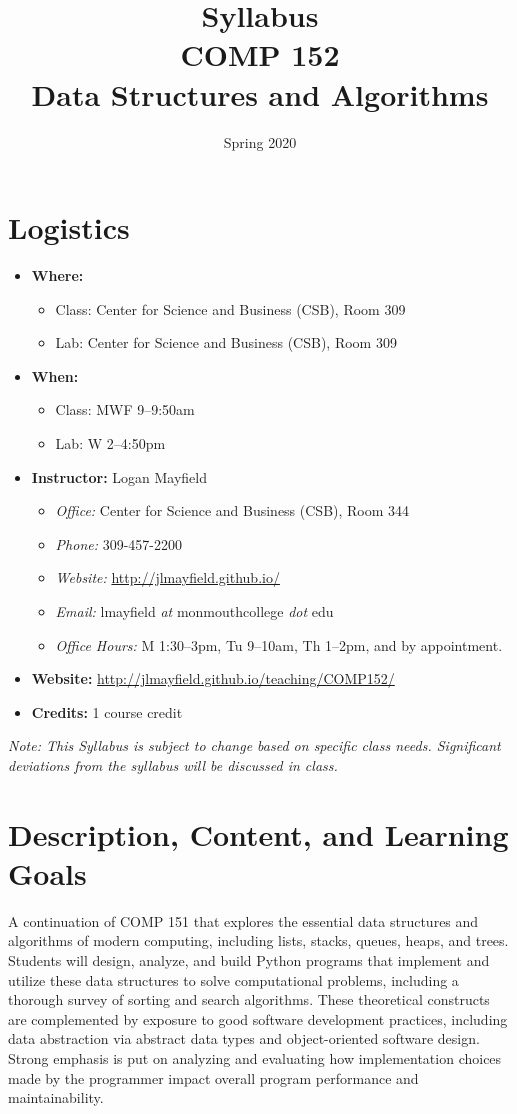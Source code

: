 \documentclass[10pt]{article}
\title{Syllabus \\ COMP 152 \\ Data Structures and Algorithms}
\author{  }
\date{Spring 2020}
\begin{document}
\maketitle

\section{Logistics}
\begin{itemize}
\item \textbf{Where: }
\begin{itemize}
\item Class: Center for Science and Business (CSB), Room 309
\item Lab: Center for Science and Business (CSB), Room 309
\end{itemize}
\item \textbf{When: }
\begin{itemize}
  \item Class: MWF 9--9:50am
  \item Lab: W 2--4:50pm
\end{itemize}
\item \textbf{Instructor: } Logan Mayfield
\begin{itemize}
\item \textit{Office: } Center for Science and Business (CSB), Room 344
\item \textit{Phone: } 309-457-2200 %
\item \textit{Website: } \url{http://jlmayfield.github.io/}
\item \textit{Email: } lmayfield \textit{at} monmouthcollege \textit{dot} edu
\item \textit{Office Hours: }   M 1:30--3pm, Tu 9--10am, Th 1--2pm, and by appointment.
\end{itemize}
\item \textbf{Website: } \url{http://jlmayfield.github.io/teaching/COMP152/}
\item \textbf{Credits: } 1 course credit
\end{itemize}
\emph{Note: This Syllabus is subject to change based on specific class needs. Significant deviations from the syllabus will be discussed in class.}


\section{Description, Content, and Learning Goals}

A continuation of COMP 151 that explores the essential data structures
and algorithms of modern computing, including lists, stacks, queues,
heaps, and trees. Students will design, analyze, and build Python
programs that implement and utilize these data structures to solve
computational problems, including a thorough survey of sorting and
search algorithms. These theoretical constructs are complemented by
exposure to good software development practices, including data
abstraction via abstract data types and object-oriented software
design. Strong emphasis is put on analyzing and evaluating how
implementation choices made by the programmer impact overall program
performance and maintainability.
\end{document}
